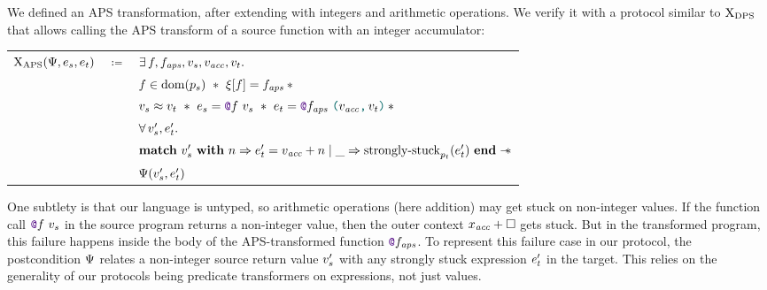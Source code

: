 We defined an APS transformation, after extending \DataLang with integers and arithmetic operations. We verify it with a protocol similar to $\mathrm{X}_\mathrm{DPS}$ that allows calling the APS transform of a source function with an integer accumulator:

\medskip
\begin{tabular}{rcl}
        $\iProt_\mathrm{APS} (\iPredTwo, \datalangExpr_s, \datalangExpr_t)$
        & $\coloneqq$ &
        $\exists \datalangFn, \datalangFn_\mathit{aps}, \datalangVal_s, \datalangVal_\mathit{acc}, \datalangVal_t \ldotp$
    \\
        &&
        $\datalangFn \in \dom{\datalangProg_s}
        \ \iSep\ %
        \datalangRenaming [\datalangFn] = \datalangFn_\mathit{aps}
        \iSep {}$
    \\
        &&
        $\datalangVal_s \iSimilar \datalangVal_t
        \ \iSep\ %
        \datalangExpr_s = \datalangCall{\datalangFnptr{\datalangFn}}{\datalangVal_s}
        \ \iSep\ %
        \datalangExpr_t = \datalangCall{\datalangFnptr{\datalangFn_\mathit{aps}}}{\datalangPair{\datalangVal_\mathit{acc}}{\datalangVal_t}}
        \iSep {}$
    \\
        &&
        $\forall \datalangVal_s', \datalangExpr_t' \ldotp$
    \\
        &&
        $\bm{\mathrm{match}}\ \datalangVal_s'\ \bm{\mathrm{with}}\ \datalangNat \Rightarrow \datalangExpr_t' = \datalangVal_\mathit{acc} + \datalangNat \mid \_ \Rightarrow \mathrm{strongly \mathhyphen stuck}_{\datalangProg_t} (\datalangExpr_t')\ \bm{\mathrm{end}} \iWand$
    \\
        &&
        $\iPredTwo (\datalangVal_s', \datalangExpr_t')$
\end{tabular}
\medskip

One subtlety is that our \DataLang language is untyped, so arithmetic operations (here addition) may get stuck on non-integer values. If the function call $\datalangCall {\datalangFnptr \datalangFn} {\datalangVal_s}$ in the source program returns a non-integer value, then the outer context $\datalangVar_\mathit{acc} + \datalangCtxHole$ gets stuck. But in the transformed program, this failure happens inside the body of the APS-transformed function $\datalangFnptr {\datalangFn_\mathit{aps}}$. To represent this failure case in our protocol, the postcondition $\Psi$ relates a non-integer source return value $\datalangVal_s'$ with any strongly stuck expression $\datalangExpr_t'$ in the target. This relies on the generality of our protocols being predicate transformers on expressions, not just values.

